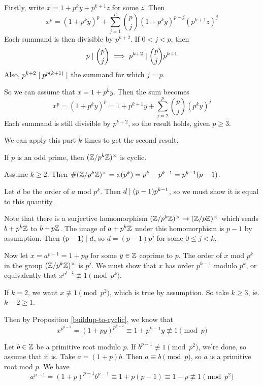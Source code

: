 \documentclass{article}
\begin{document}
\begin{prf}
    Firstly, write $x = 1 + p^k y + p^{k+1} z$ for some $z$. Then
    \[
	x^p = \left( 1 + p^k y \right)^p + \sum_{j=1}^p \binom{p}{j} \left( 1 + p^k y \right)^{p-j} \left( p^{k+1} z \right)^j
	\]
	Each summand is then divisible by $p^{k+2}$. If $0 < j < p$, then
	\[
	p \mid \binom{p}{j} \implies p^{k+2} \mid \binom{p}{j} p^{k+1}
	\]
	Also, $p^{k+2} \mid p^{p(k+1)} \mid $ the summand for which $j = p$.
	
	So we can assume that $x = 1 + p^k y$. Then the sum becomes
	\[
	x^p = \left( 1 + p^k y \right)^p = 1 + p^{k+1} y + \sum_{j=2}^p \binom{p}{j} \left( p^k y \right)^j
	\]
	Each summand is still divisible by $p^{k+2}$, so the result holds, given $p \geq 3$.
	
	We can apply this part $k$ times to get the second result.
\end{prf}

\begin{theorem}
    If $p$ is an odd prime, then $(\mathbb{Z}/p^k\mathbb{Z})^\times$ is cyclic.
\end{theorem}

\begin{prf}
    Assume $k \geq 2$. Then $\# (\mathbb{Z}/p^k\mathbb{Z})^\times = \phi(p^k) = p^k - p^{k-1} = p^{k-1} (p-1) $.
    
    Let $d$ be the order of $a$ mod $p^k$. Then $d \mid (p-1)p^{k-1}$, so we must show it is equal to this quantity.
    
    Note that there is a surjective homomorphism $(\mathbb{Z}/p^k\mathbb{Z})^\times \to (\mathbb{Z}/p\mathbb{Z})^\times$ which sends $b + p^k \mathbb{Z}$ to $b + p \mathbb{Z}$. The image of $a + p^k \mathbb{Z}$ under this homomorphism is $p-1$ by assumption. Then $(p-1) \mid d$, so $d = (p-1)p^j$ for some $0 \leq j < k$.
    
    Now let $x = a^{p-1} = 1 + py$ for some $y \in \mathbb{Z}$ coprime to $p$. The order of $x$ mod $p^k$ in the group $(\mathbb{Z}/p^k\mathbb{Z})^\times$ is $p^j$. We must show that $x$ has order $p^{k-1}$ modulo $p^k$, or equivalently that $x^{p^{k-2}} \not\equiv 1 \pmod{p^k}$.
    
    If $k=2$, we want $x \not\equiv 1 \pmod{p^2}$, which is true by assumption. So take $k \geq 3$, ie. $k-2 \geq 1$.
    
    Then by Proposition \ref{buildup-to-cyclic}, we know that
    \[
	x^{p^{k-2}} = (1+py)^{p^{k-2}} \equiv 1 + p^{k-1}y \not\equiv 1\pmod{p}
	\]
	
	Let $b \in \mathbb{Z}$ be a primitive root modulo $p$. If $b^{p-1} \not\equiv 1 \pmod{p^2}$, we're done, so assume that it is.
	Take $a = (1 + p) b$. Then $a \equiv b \pmod{p}$, so $a$ is a primitive root mod $p$. We have
	\[
	a^{p-1} = (1+p)^{p-1} b^{p-1} \equiv 1 + p(p-1) \equiv 1 - p \not\equiv 1 \pmod{p^2}
	\]
\end{prf}
\end{document}
